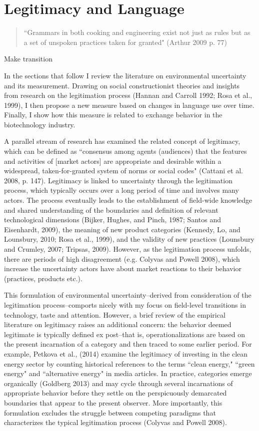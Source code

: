 \chapter{Legitimacy and Language\label{lang}}

\begin{small}
\begin{quote}
``Grammars in both cooking and engineering exist not just as rules but as a set of unspoken practices taken for granted" (Arthur 2009 p. 77)
\end{quote}
\end{small}
Make transition

In the sections that follow I review the literature on environmental uncertainty and its measurement. Drawing on social constructionist theories and insights from research on the legitimation process (Hannan and Carroll 1992; Rosa et al., 1999), I then propose a new measure based on changes in language use over time. Finally, I show how this measure is related to exchange behavior in the biotechnology industry.


A parallel stream of research has examined the related concept of legitimacy, which can be defined as ``consensus among agents (audiences) that the features and activities of [market actors] are appropriate and desirable within a widespread, taken-for-granted system of norms or social codes" (Cattani et al. 2008, p. 147). Legitimacy is linked to uncertainty through the legitimation process, which typically occurs over a long period of time and involves many actors. The process eventually leads to the establishment of field-wide knowledge and shared understanding of the boundaries and definition of relevant technological dimensions (Bijker, Hughes, and Pinch, 1987; Santos and Eisenhardt, 2009), the meaning of new product categories (Kennedy, Lo, and Lounsbury, 2010; Rosa et al., 1999), and the validity of new practices (Lounsbury and Crumley, 2007; Tripsas, 2009). However, as the legitimation process unfolds, there are periods of high disagreement (e.g. Colyvas and Powell 2008), which increase the uncertainty actors have about market reactions to their behavior (practices, products etc.).

This formulation of environmental uncertainty--derived from consideration of the legitimation process--comports nicely with my focus on field-level transitions in technology, taste and attention. However, a brief review of the empirical literature on legitimacy raises an additional concern: the behavior deemed legitimate is typically defined ex post--that is, operationalizations are based on the present incarnation of a category and then traced to some earlier period. For example, Petkova et al., (2014) examine the legitimacy of investing in the clean energy sector by counting historical references to the terms ``clean energy," ``green energy" and ``alternative energy" in media articles. In practice, categories emerge organically (Goldberg 2013) and may cycle through several incarnations of appropriate behavior before they settle on the perspicuously demarcated boundaries that appear to the present observer. More importantly, this formulation excludes the struggle between competing paradigms that characterizes the typical legitimation process (Colyvas and Powell 2008).

